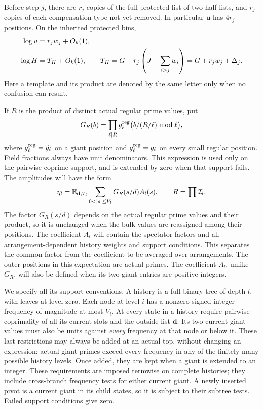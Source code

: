 Before step $j$, there are $r_j$ copies of the full protected list
of two half-lists, and $r_j$ copies of each compensation type not
yet removed.  In particular $\mathbf u$ has $4r_j$ positions.
On the inherited protected bins,
\begin{align}
 \log u&=r_jw_j+O_k(1),\notag\\
 \log H&=T_H+O_k(1),\qquad
 T_H=G+r_j\left(J+\sum_{i>j}w_i\right)
       =G+r_jw_j+\Delta_j.
 \label{eq:src48}
\end{align}
Here a template and its product are denoted by the same letter only
when no confusion can result.

If $R$ is the product of distinct actual regular prime values, put
\[
 G_R(b)=\prod_{\ell\mid R}
             g_\ell^{\rm reg}\bigl(b/(R/\ell)\bmod\ell\bigr),
\]
where $g_\ell^{\rm reg}=\widetilde g_\ell$ on a giant position and
$g_\ell^{\rm reg}=g_\ell$ on every small regular position.  Field
fractions always have unit denominators.  This expression is used
only on the pairwise coprime support, and is extended by zero when
that support fails.  The amplitudes will have the form
\begin{equation}
 \eta_l=\E_{\mathbf d,\mathcal I_l}
       \sum_{0<|s|\le V_l}G_R(s/d)A_l(s),
                  \qquad R=\prod\mathcal I_l.
 \label{eq:src49}
\end{equation}
The factor $G_R(s/d)$ depends on the actual regular prime values and
their product, so it is unchanged when the bulk values are reassigned
among their positions.  The coefficient $A_l$ will contain the
spectator factors and all arrangement-dependent history weights and
support conditions.  This separates the common factor from the
coefficient to be averaged over arrangements.
The outer positions in this expectation are actual primes.
The coefficient $A_l$, unlike $G_R$, will also be defined when its
two giant entries are positive integers.

We specify all its support conventions.  A history is a full binary
tree of depth $l$, with leaves at level zero.  Each node at level
$i$ has a nonzero signed integer frequency of magnitude at most
$V_i$.  At every state in a history require pairwise coprimality of
all its current slots and the outside list $\mathbf d$.  Its two
current giant values must also be units against \emph{every}
frequency at that node or below it.  These last restrictions may
always be added at an actual top, without changing an expression:
actual giant primes exceed every frequency in any of the finitely
many possible history levels.  Once added, they are kept when a
giant is extended to an integer.  These requirements are imposed
termwise on complete histories; they include cross-branch
frequency tests for either current giant.  A newly inserted pivot
is a current giant in its child states, so it is subject to their
subtree tests.  Failed support conditions give zero.

